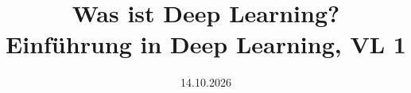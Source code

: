 %



\graphicspath{{../images/}}

\title[Was ist Deep Learning? (VL 1)]{Was ist Deep Learning?\\\large Einführung in Deep Learning, VL 1}
\date{14.10.2026}



